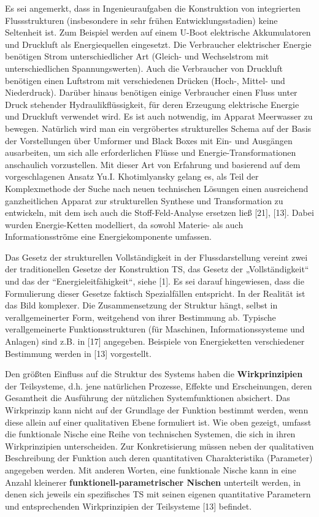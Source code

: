 \documentclass[11pt,a4paper]{article}
\begin{document}
\begin{emph}
  Es sei angemerkt, dass in Ingenieuraufgaben die Konstruktion von
  integrierten Flussstrukturen (insbesondere in sehr frühen
  Entwicklungsstadien) keine Seltenheit ist. Zum Beispiel werden auf einem
  U-Boot elektrische Akkumulatoren und Druckluft als Energiequellen
  eingesetzt.  Die Verbraucher elektrischer Energie benötigen Strom
  unterschiedlicher Art (Gleich- und Wechselstrom mit unterschiedlichen
  Spannungswerten).  Auch die Verbraucher von Druckluft benötigen einen
  Luftstrom mit verschiedenen Drücken (Hoch-, Mittel- und Niederdruck).
  Darüber hinaus benötigen einige Verbraucher einen Fluss unter Druck
  stehender Hydraulikflüssigkeit, für deren Erzeugung elektrische Energie und
  Druckluft verwendet wird. Es ist auch notwendig, im Apparat Meerwasser zu
  bewegen.  Natürlich wird man ein vergröbertes strukturelles Schema auf der
  Basis der Vorstellungen über Umformer und Black Boxes mit Ein- und Ausgängen
  ausarbeiten, um sich alle erforderlichen Flüsse und Energie-Transformationen
  anschaulich vorzustellen. Mit dieser Art von Erfahrung und basierend auf dem
  vorgeschlagenen Ansatz Yu.I. Khotimlyansky gelang es, als Teil der
  Komplexmethode der Suche nach neuen technischen Lösungen einen ausreichend
  ganzheitlichen Apparat zur strukturellen Synthese und Transformation zu
  entwickeln, mit dem isch auch die Stoff-Feld-Analyse ersetzen ließ [21],
  [13].  Dabei wurden Energie-Ketten modelliert, da sowohl Materie- als auch
  Informationsströme eine Energiekomponente umfassen.
\end{emph}

Das Gesetz der strukturellen Vollständigkeit in der Flussdarstellung vereint
zwei der traditionellen Gesetze der Konstruktion TS, das Gesetz der
„Vollständigkeit“ und das der “Energieleitfähigkeit“, siehe [1]. Es sei darauf
hingewiesen, dass die Formulierung dieser Gesetze faktisch Spezialfällen
entspricht. In der Realität ist das Bild komplexer. Die Zusammensetzung der
Struktur hängt, selbst in verallgemeinerter Form, weitgehend von ihrer
Bestimmung ab. Typische verallgemeinerte Funktionsstrukturen (für Maschinen,
Informationssysteme und Anlagen) sind z.B. in [17] angegeben. Beispiele von
Energieketten verschiedener Bestimmung werden in [13] vorgestellt.

Den größten Einfluss auf die Struktur des Systems haben die
\textbf{Wirkprinzipien} der Teilsysteme, d.h.  jene natürlichen Prozesse,
Effekte und Erscheinungen, deren Gesamtheit die Ausführung der nützlichen
Systemfunktionen absichert. Das Wirkprinzip kann nicht auf der Grundlage der
Funktion bestimmt werden, wenn diese allein auf einer qualitativen Ebene
formuliert ist. Wie oben gezeigt, umfasst die funktionale Nische eine Reihe
von technischen Systemen, die sich in ihren Wirkprinzipien unterscheiden.  Zur
Konkretisierung müssen neben der qualitativen Beschreibung der Funktion auch
deren quantitativen Charakteristika (Parameter) angegeben werden. Mit anderen
Worten, eine funktionale Nische kann in eine Anzahl kleinerer
\textbf{funktionell-parametrischer Nischen} unterteilt werden, in denen sich
jeweils ein spezifisches TS mit seinen eigenen quantitative Parametern und
entsprechenden Wirkprinzipien der Teilsysteme [13] befindet.
\end{document}
